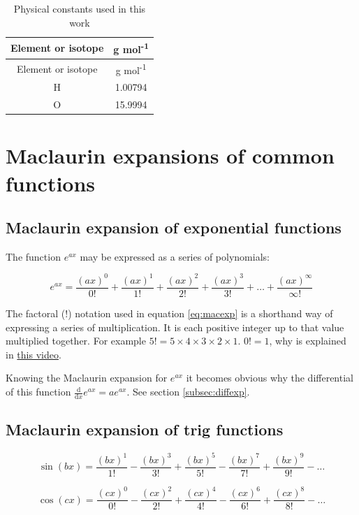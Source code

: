 \documentclass[
]{book}
\begin{document}
\begin{longtable}[]{@{}cc@{}}
\caption{Physical constants used in this work\label{tab:physicalconst}}\tabularnewline
\toprule
Element or isotope & g mol\textsuperscript{-1} \\
\midrule
\endfirsthead
\toprule
Element or isotope & g mol\textsuperscript{-1} \\
\midrule
\endhead
H & 1.00794 \\
O & 15.9994 \\
\bottomrule
\end{longtable}

\hypertarget{sec:maclaurin}{%
\section{Maclaurin expansions of common functions}\label{sec:maclaurin}}

\hypertarget{subsec:macexp}{%
\subsection{Maclaurin expansion of exponential functions}\label{subsec:macexp}}

The function \(e^{ax}\) may be expressed as a series of polynomials:

\begin{equation}
e^{ax} = \frac{(ax)^0}{0!} + \frac{(ax)^1}{1!} + \frac{(ax)^2}{2!} + \frac{(ax)^3}{3!} + \dots + \frac{(ax)^\infty}{\infty!}
\label{eq:macexp}
\end{equation}

The factoral (\(!\)) notation used in equation \eqref{eq:macexp} is a shorthand way of expressing a series of multiplication. It is each positive integer up to that value multiplied together. For example \(5! = 5 \times 4 \times 3\times 2 \times 1\). \(0!=1\), why is explained in \href{https://www.youtube.com/watch?v=Mfk_L4Nx2ZI}{this video}.

Knowing the Maclaurin expansion for \(e^{ax}\) it becomes obvious why the differential of this function \(\frac{\textrm{d}}{\textrm{d}x}e^{ax}=ae^{ax}\). See section \ref{subsec:diffexp}.

\hypertarget{subsec:mactrig}{%
\subsection{Maclaurin expansion of trig functions}\label{subsec:mactrig}}

\begin{equation}
\sin(bx) = \frac{(bx)^1}{1!} - \frac{(bx)^3}{3!} + \frac{(bx)^5}{5!} - \frac{(bx)^7}{7!}  + \frac{(bx)^9}{9!} - \dots
\label{eq:macsin}
\end{equation}

\begin{equation}
\cos(cx) = \frac{(cx)^0}{0!} - \frac{(cx)^2}{2!} + \frac{(cx)^4}{4!} - \frac{(cx)^6}{6!}  + \frac{(cx)^8}{8!} - \dots
\label{eq:maccos}
\end{equation}

  
\end{document}
